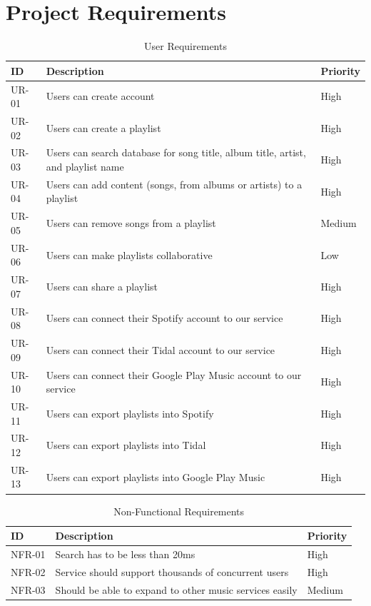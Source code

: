 \documentclass[12pt]{article}
\begin{document}
	\section{Project Requirements}
	\begin{table}[H]
		\centering
		\label{tab:ur}
		\caption*{User Requirements}
		\begin{tabularx}{450pt}{lXl}
			ID & Description & Priority\\\hline
			UR-01 & Users can create account & High \\
			UR-02 & Users can create a playlist & High \\
			UR-03 & Users can search database for song title, album title,
			artist, and playlist name & High \\
			UR-04 & Users can add content (songs, from albums or artists) to a playlist & High \\
			UR-05 & Users can remove songs from a playlist & Medium \\
			UR-06 & Users can make playlists collaborative & Low \\
			UR-07 & Users can share a playlist & High \\
			UR-08 & Users can connect their Spotify account to our service & High \\
			UR-09 & Users can connect their Tidal account to our service & High \\
			UR-10 & Users can connect their Google Play Music account to our service & High \\
			UR-11 & Users can export playlists into Spotify & High \\
			UR-12 & Users can export playlists into Tidal & High \\
			UR-13 & Users can export playlists into Google Play Music & High \\
		\end{tabularx}
	\end{table}
	\begin{table}[H]
		\centering
		\label{tab:nfr}
		\caption*{Non-Functional Requirements}
		\begin{tabularx}{450pt}{lXl}
			ID & Description & Priority\\\hline
			NFR-01 & Search has to be less than 20ms & High \\
			NFR-02 & Service should support thousands of concurrent users & High \\
			NFR-03 & Should be able to expand to other music services easily & Medium \\
		\end{tabularx}
	\end{table}
\end{document}
